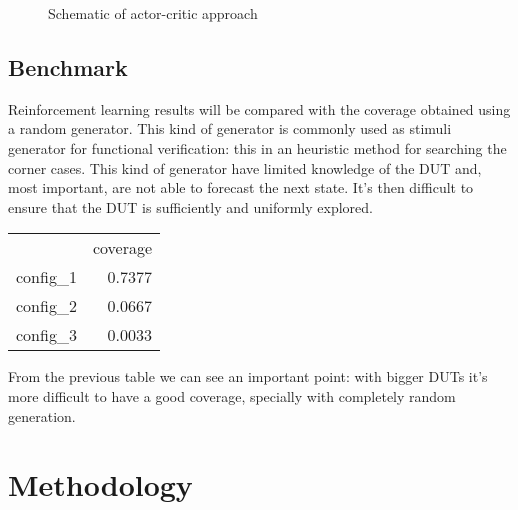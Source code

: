 \documentclass{article}
\begin{document}
\begin{figure}
\begin{center}
\caption{Schematic of actor-critic approach}
\label{AC}
\end{center}
\end{figure}

\subsection{Benchmark}
% 
% 
% 
Reinforcement learning results will be compared with the coverage obtained using a random generator. This kind of generator is commonly used as stimuli generator for functional verification: this in an heuristic method for searching the corner cases. This kind of generator have limited knowledge of the DUT and, most important, are not able to forecast the next state. It's then difficult to ensure that the DUT is sufficiently and uniformly explored. 
\begin{center}
  \begin{tabular}{ | l | r | }
    \hline
      & coverage \\
    config\_1 & 0.7377 \\
    config\_2 & 0.0667 \\
    config\_3 & 0.0033 \\
    \hline
  \end{tabular}
\end{center}
From the previous table we can see an important point: with bigger DUTs it's more difficult to have a good coverage, specially with completely random generation. 

\section{Methodology}
% 
\end{document}
